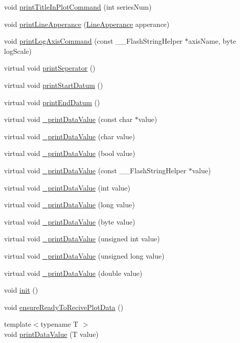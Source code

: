 \begin{DoxyCompactItemize}
\item 
void \hyperlink{class_g_n_u_plot_base_a65ae2b3220034bce21c7feb39a632991}{print\+Title\+In\+Plot\+Command} (int series\+Num)
\item 
void \hyperlink{class_g_n_u_plot_base_ad057969aa7f8bdbe884d6a5d03a29722}{print\+Line\+Apperance} (\hyperlink{struct_line_apperance}{Line\+Apperance} apperance)
\item 
void \hyperlink{class_g_n_u_plot_base_ad7e8ef8d8e5eb80119fc0cce9be2d525}{print\+Log\+Axis\+Command} (const \+\_\+\+\_\+\+Flash\+String\+Helper $\ast$axis\+Name, byte log\+Scale)
\item 
virtual void \hyperlink{class_g_n_u_plot_base_ae204818b4e8dcd9d2f6b5426127ca2cf}{print\+Seperator} ()
\item 
virtual void \hyperlink{class_g_n_u_plot_base_ac2b48b822b6043392b514c9580b1661a}{print\+Start\+Datum} ()
\item 
virtual void \hyperlink{class_g_n_u_plot_base_aff02bc279e6c3cb83f2cdc7aa021268f}{print\+End\+Datum} ()
\item 
virtual void \hyperlink{class_g_n_u_plot_base_ad00a12fd681e4638fae005891fd72f38}{\+\_\+print\+Data\+Value} (const char $\ast$value)
\item 
virtual void \hyperlink{class_g_n_u_plot_base_aa6c6dfff0568dd99c0c28081c41b4433}{\+\_\+print\+Data\+Value} (char value)
\item 
virtual void \hyperlink{class_g_n_u_plot_base_a6f14fc040ff833c685ab09fc7917e059}{\+\_\+print\+Data\+Value} (bool value)
\item 
virtual void \hyperlink{class_serial_graph_a0c4d2c1239de3107d7332389183b05a1}{\+\_\+print\+Data\+Value} (const \+\_\+\+\_\+\+Flash\+String\+Helper $\ast$value)
\item 
virtual void \hyperlink{class_serial_graph_a58edf4683c600b6bfa1714b0f8dfc82c}{\+\_\+print\+Data\+Value} (int value)
\item 
virtual void \hyperlink{class_serial_graph_a9a4903d4fa26bb85ba5dd93c4365bcc2}{\+\_\+print\+Data\+Value} (long value)
\item 
virtual void \hyperlink{class_serial_graph_acada5333b96b65e31d8c76c3ab22905f}{\+\_\+print\+Data\+Value} (byte value)
\item 
virtual void \hyperlink{class_serial_graph_acd91cf0c3a0f49d4bdf18b447503da23}{\+\_\+print\+Data\+Value} (unsigned int value)
\item 
virtual void \hyperlink{class_serial_graph_a6dbfe61ee398e18c1b752a3748df9663}{\+\_\+print\+Data\+Value} (unsigned long value)
\item 
virtual void \hyperlink{class_serial_graph_a766d5838ede9c8fa998ce8664e5f92be}{\+\_\+print\+Data\+Value} (double value)
\item 
void \hyperlink{class_serial_graph_a760dd00474c9780c81ece7cdf621fc15}{init} ()
\item 
void \hyperlink{class_serial_graph_abd43150abedec26eef3994cd33035173}{ensure\+Ready\+To\+Recive\+Plot\+Data} ()
\item 
{\footnotesize template$<$typename T $>$ }\\void \hyperlink{class_serial_graph_a91e20c05c8cc612fd9ffd85880149264}{print\+Data\+Value} (T value)
\end{DoxyCompactItemize}
